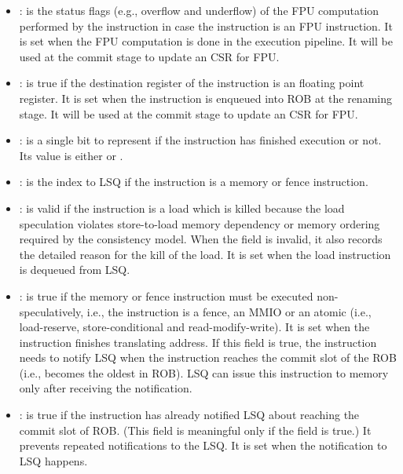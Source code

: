 \begin{itemize}
    \item {}: is the status flags (e.g., overflow and underflow) of the FPU computation performed by the instruction in case the instruction is an FPU instruction.
    It is set when the FPU computation is done in the execution pipeline.
    It will be used at the commit stage to update an CSR for FPU.
    
    \item {}: is true if the destination register of the instruction is an floating point register.
    It is set when the instruction is enqueued into ROB at the renaming stage.
    It will be used at the commit stage to update an CSR for FPU.
    
    \item {}: is a single bit to represent if the instruction has finished execution or not.
    Its value is either  or .
    
    \item {}: is the index to LSQ if the instruction is a memory or fence instruction.
    
    \item {}: is valid if the instruction is a load which is killed because the load speculation violates store-to-load memory dependency or memory ordering required by the consistency model.
    When the field is invalid, it also records the detailed reason for the kill of the load.
    It is set when the load instruction is dequeued from LSQ.
    
    \item {}: is true if the memory or fence instruction must be executed non-speculatively, i.e., the instruction is a fence, an MMIO or an atomic (i.e., load-reserve, store-conditional and read-modify-write).
    It is set when the instruction finishes translating address.
    If this field is true, the instruction needs to notify LSQ when the instruction reaches the commit slot of the ROB (i.e., becomes the oldest in ROB).
    LSQ can issue this instruction to memory only after receiving the notification.
    
    \item {}: is true if the instruction has already notified LSQ about reaching the commit slot of ROB.
    (This field is meaningful only if the  field is true.)
    It prevents repeated notifications to the LSQ.
    It is set when the notification to LSQ happens.
    

\end{itemize}

